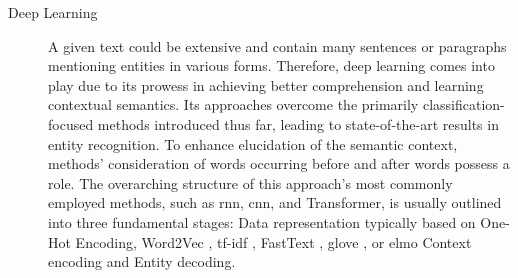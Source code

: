 \begin{description}
\begin{figure}[H]
    \end{figure}
    \item[Deep Learning] A given text could be extensive and contain many sentences or paragraphs mentioning entities in various forms. Therefore, deep learning comes into play due to its prowess in achieving better comprehension and learning contextual semantics. Its approaches overcome the primarily classification-focused methods introduced thus far, leading to state-of-the-art results in entity recognition. To enhance elucidation of the semantic context, methods' consideration of words occurring before and after words possess a role. The overarching structure of this approach's most commonly employed methods, such as \acrfull{rnn}, \acrfull{cnn}, and Transformer, is usually outlined into three fundamental stages: Data representation typically based on One-Hot Encoding, Word2Vec \parencite{mikolov2013word2vec}, \acrfull{tf-idf} \parencite{AIZAWA200345tfidf}, FastText \parencite{joulin2016bagfasttext}, \acrfull{glove} \parencite{pennington-etal-2014-glove}, or \acrfull{elmo} \parencite{peters2018elmo}Context encoding and Entity decoding.
\end{description}


